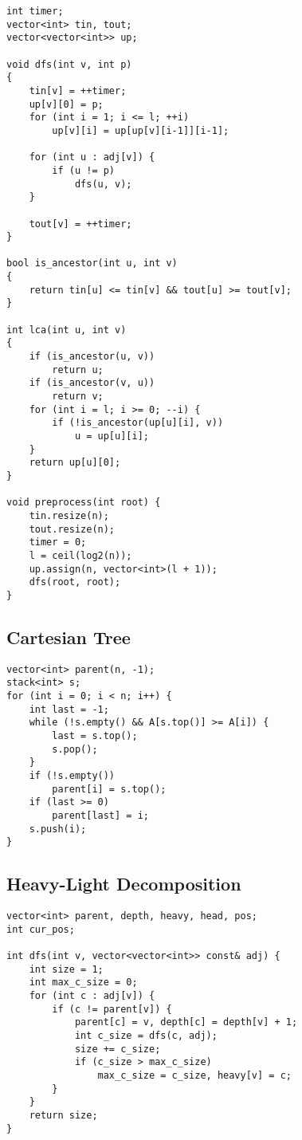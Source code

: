 \documentclass[10pt]{article}
\begin{document}
\begin{multicols*}{2}
\begin{lstlisting}[style=compactcpp]
int timer;
vector<int> tin, tout;
vector<vector<int>> up;

void dfs(int v, int p)
{
    tin[v] = ++timer;
    up[v][0] = p;
    for (int i = 1; i <= l; ++i)
        up[v][i] = up[up[v][i-1]][i-1];

    for (int u : adj[v]) {
        if (u != p)
            dfs(u, v);
    }

    tout[v] = ++timer;
}

bool is_ancestor(int u, int v)
{
    return tin[u] <= tin[v] && tout[u] >= tout[v];
}

int lca(int u, int v)
{
    if (is_ancestor(u, v))
        return u;
    if (is_ancestor(v, u))
        return v;
    for (int i = l; i >= 0; --i) {
        if (!is_ancestor(up[u][i], v))
            u = up[u][i];
    }
    return up[u][0];
}

void preprocess(int root) {
    tin.resize(n);
    tout.resize(n);
    timer = 0;
    l = ceil(log2(n));
    up.assign(n, vector<int>(l + 1));
    dfs(root, root);
}
\end{lstlisting}

\subsection{Cartesian Tree}

\begin{lstlisting}[style=compactcpp]
vector<int> parent(n, -1);
stack<int> s;
for (int i = 0; i < n; i++) {
    int last = -1;
    while (!s.empty() && A[s.top()] >= A[i]) {
        last = s.top();
        s.pop();
    }
    if (!s.empty())
        parent[i] = s.top();
    if (last >= 0)
        parent[last] = i;
    s.push(i);
}
\end{lstlisting}

\subsection{Heavy-Light Decomposition}

\begin{lstlisting}[style=compactcpp]
vector<int> parent, depth, heavy, head, pos;
int cur_pos;

int dfs(int v, vector<vector<int>> const& adj) {
    int size = 1;
    int max_c_size = 0;
    for (int c : adj[v]) {
        if (c != parent[v]) {
            parent[c] = v, depth[c] = depth[v] + 1;
            int c_size = dfs(c, adj);
            size += c_size;
            if (c_size > max_c_size)
                max_c_size = c_size, heavy[v] = c;
        }
    }
    return size;
}


\end{lstlisting}
\end{multicols*}
\end{document}
